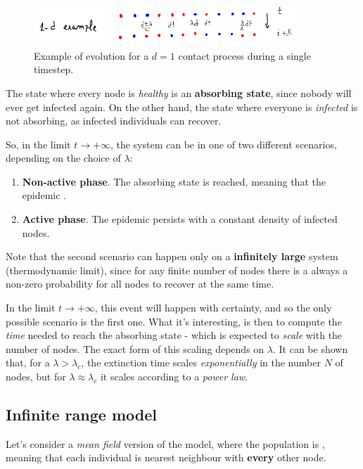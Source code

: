 \documentclass[../../main.tex]{subfiles}
\begin{document}
\begin{figure}[H]
    \centering
    \includegraphics[width=0.9\textwidth]{contact-process.png}
    \caption{Example of evolution for a $d=1$ contact process during a single timestep.}
    \label{fig:contact-process}
\end{figure}
The state where every node is \textit{healthy} is an \textbf{absorbing state}, since nobody will ever get infected again. On the other hand, the state where everyone is \textit{infected} is not absorbing, as infected individuals can recover.

\medskip

So, in the limit $t \to +\infty$, the system can be in one of two different scenarios, depending on the choice of $\lambda$:
\begin{enumerate}
    \item \textbf{Non-active phase}. The absorbing state is reached, meaning that the epidemic .
    \item \textbf{Active phase}. The epidemic persists with a constant density of infected nodes.
\end{enumerate}

Note that the second scenario can happen only on a \textbf{infinitely large} system (thermodynamic limit), since for any finite number of nodes there is a always a non-zero probability for all nodes to recover at the same time.

In the limit $t \to +\infty$, this event will happen with certainty, and so the only possible scenario is the first one. What it's interesting, is then to compute the \textit{time} needed to reach the absorbing state - which is expected to \textit{scale} with the number of nodes. The exact form of this scaling depends on $\lambda$. It can be shown that, for a $\lambda > \lambda_c$, the extinction time scales \textit{exponentially} in the number $N$ of nodes, but for $\lambda \approx \lambda_c$ it scales according to a \textit{power law}.

\subsection{Infinite range model}
Let's consider a \textit{mean field} version of the model, where the population is , meaning that each individual is nearest neighbour with \textbf{every} other node. 
\end{document}
